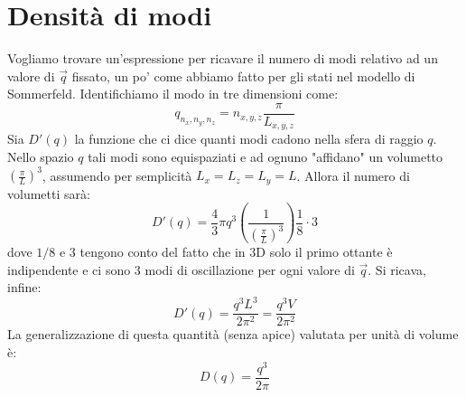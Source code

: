 \documentclass{book}
\begin{document}
    \section{Densità di modi}
            Vogliamo trovare un'espressione per ricavare il numero di modi relativo ad un valore di $\vec{q}$ fissato, un po' come abbiamo fatto per gli stati nel modello di Sommerfeld. Identifichiamo il modo in tre dimensioni come:
            $$q_{n_{x},n_{y},n_{z}} = n_{x,y,z}\frac{\pi}{L_{x,y,z}}$$
            Sia $D' (q)$ la funzione che ci dice quanti modi cadono nella sfera di raggio $q$. Nello spazio $q$ tali modi sono equispaziati e ad ognuno "affidano" un volumetto $ \displaystyle (\frac{\pi}{L})^{3}$, assumendo per semplicità $L_{x}=L_{z}=L_{y} = L$.
            Allora il numero di volumetti sarà:
            $$D '(q) = \frac{4}{3} \pi q^{3} (\frac{1}{(\frac{\pi}{L})^{3}}) \frac{1}{8} \cdot 3$$
            dove $1/8$ e $3$ tengono conto del fatto che in 3D solo il primo ottante è indipendente e ci sono 3 modi di oscillazione per ogni valore di $\vec{q}$.
            Si ricava, infine:
            $$D ' (q) = \frac{q^{3}L^{3}}{2 \pi^{2}} = \frac{q^{3}V}{2 \pi^{2}}$$
            La generalizzazione di questa quantità (senza apice) valutata per unità di volume è:
            $$D(q) = \frac{q^{3}}{2 \pi}$$
\end{document}
